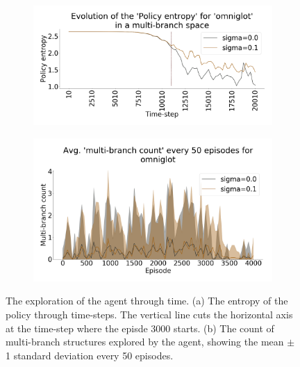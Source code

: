 \begin{figure}[ht]
\centering
\begin{subfigure}{.53\textwidth}
  \centering
      \includegraphics[width=\linewidth]{imgs/multibranch/entropy.png}
  \caption{}
  \label{fig:results:exp3:exploration:a}
\end{subfigure}%
\begin{subfigure}{.44\textwidth}
  \centering
      \includegraphics[width=\linewidth]{imgs/multibranch/average-mb_count-omniglot.png}
  \caption{}
  \label{fig:results:exp3:exploration:b}
\end{subfigure}
\caption{The exploration of the agent through time. (a) The entropy of the policy through time-steps. The vertical line cuts the horizontal axis at the time-step where the episde 3000 starts. (b) The count of multi-branch structures explored by the agent, showing the mean $\pm$ 1 standard deviation every 50 episodes.\\}
\label{fig:results:exp3:exploration}
\vspace{-0.5cm}
\end{figure}


